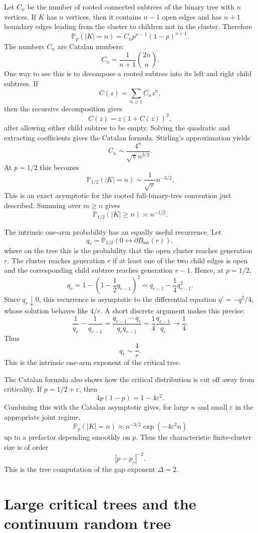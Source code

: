\documentclass[11pt,reqno]{book}
\numberwithin{equation}{chapter}
\theoremstyle{plain}
\theoremstyle{definition}
\theoremstyle{remark}
\newcommand{\Pp}{\mathbb P_p}
\renewcommand{\P}{\mathbb P}
\newcommand{\eps}{\varepsilon}
\newcommand{\1}{\mathbf 1}
\newcommand{\as}{\asymp}
\begin{document}
Let $C_n$ be the number of rooted connected subtrees of the binary tree with $n$ vertices. If $K$ has $n$ vertices, then it contains $n-1$ open edges and has $n+1$ boundary edges leading from the cluster to children not in the cluster. Therefore
\[
  \Pp(|K|=n)=C_n p^{n-1}(1-p)^{n+1}.
\]
The numbers $C_n$ are Catalan numbers:
\[
  C_n=\frac1{n+1}\binom{2n}{n}.
\]
One way to see this is to decompose a rooted subtree into its left and right child subtrees. If
\[
  C(z)=\sum_{n\geq 1}C_n z^n,
\]
then the recursive decomposition gives
\[
  C(z)=z(1+C(z))^2,
\]
after allowing either child subtree to be empty. Solving the quadratic and extracting coefficients gives the Catalan formula. Stirling's approximation yields
\[
  C_n\sim \frac{4^n}{\sqrt{\pi}n^{3/2}}.
\]
At $p=1/2$ this becomes
\[
  \P_{1/2}(|K|=n)
  \sim
  \frac{1}{\sqrt{\pi}}n^{-3/2}.
\]
This is an exact asymptotic for the rooted full-binary-tree convention just described. Summing over $m\geq n$ gives
\[
  \P_{1/2}(|K|\geq n)\as n^{-1/2}.
\]

The intrinsic one-arm probability has an equally useful recurrence. Let
\[
  q_r=\P_{1/2}(0\leftrightarrow \partial B_{\mathrm{int}}(r)),
\]
where on the tree this is the probability that the open cluster reaches generation $r$. The cluster reaches generation $r$ if at least one of the two child edges is open and the corresponding child subtree reaches generation $r-1$. Hence, at $p=1/2$,
\[
  q_r=1-\left(1-\frac12 q_{r-1}\right)^2
  =
  q_{r-1}-\frac14 q_{r-1}^2.
\]
Since $q_r\downarrow 0$, this recurrence is asymptotic to the differential equation $q'=-q^2/4$, whose solution behaves like $4/r$. A short discrete argument makes this precise:
\[
  \frac1{q_r}-\frac1{q_{r-1}}
  =
  \frac{q_{r-1}-q_r}{q_rq_{r-1}}
  =
  \frac14\frac{q_{r-1}}{q_r}
  \longrightarrow \frac14.
\]
Thus
\[
  q_r\sim \frac4r.
\]
This is the intrinsic one-arm exponent of the critical tree.

The Catalan formula also shows how the critical distribution is cut off away from criticality. If $p=1/2+\eps$, then
\[
  4p(1-p)=1-4\eps^2.
\]
Combining this with the Catalan asymptotic gives, for large $n$ and small $\eps$ in the appropriate joint regime,
\[
  \Pp(|K|=n)
  \approx
  n^{-3/2}\exp(-4\eps^2 n)
\]
up to a prefactor depending smoothly on $p$. Thus the characteristic finite-cluster size is of order
\[
  |p-p_c|^{-2}.
\]
This is the tree computation of the gap exponent $\Delta=2$.

\section{Large critical trees and the continuum random tree}
\end{document}
